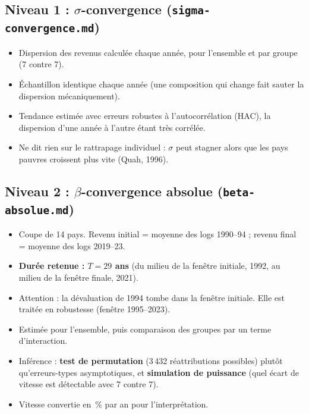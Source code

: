 \documentclass[14pt,a4paper]{article}
\newcommand{\sig}{\texorpdfstring{$\sigma$}{sigma}}
\newcommand{\bet}{\texorpdfstring{$\beta$}{beta}}
\begin{document}
	\subsection{Niveau 1 : \sig-convergence (\texttt{sigma-convergence.md})}
	\begin{itemize}
		\item Dispersion des revenus calculée chaque année, pour l'ensemble et par groupe (7 contre 7).
		\item Échantillon identique chaque année (une composition qui change fait sauter la dispersion mécaniquement).
		\item Tendance estimée avec erreurs robustes à l'autocorrélation (HAC), la dispersion d'une année à l'autre étant très corrélée.
		\item Ne dit rien sur le rattrapage individuel : \sig{} peut stagner alors que les pays pauvres croissent plus vite (Quah, 1996).
	\end{itemize}
	
	\subsection{Niveau 2 : \bet-convergence absolue (\texttt{beta-absolue.md})}
	\begin{itemize}
		\item Coupe de 14 pays. Revenu initial = moyenne des logs 1990--94 ; revenu final = moyenne des logs 2019--23.
		\item \textbf{Durée retenue : $T = 29$ ans} (du milieu de la fenêtre initiale, 1992, au milieu de la fenêtre finale, 2021).
		\item Attention : la dévaluation de 1994 tombe dans la fenêtre initiale. Elle est traitée en robustesse (fenêtre 1995--2023).
		\item Estimée pour l'ensemble, puis comparaison des groupes par un terme d'interaction.
		\item Inférence : \textbf{test de permutation} (3\,432 réattributions possibles) plutôt qu'erreurs-types asymptotiques, et \textbf{simulation de puissance} (quel écart de vitesse est détectable avec 7 contre 7).
		\item Vitesse convertie en \,\% par an pour l'interprétation.
	\end{itemize}
	
\end{document}
